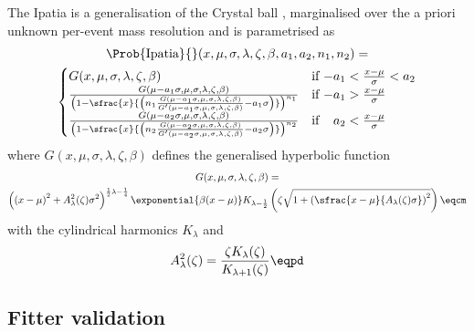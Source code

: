 The Ipatia \PDF \cite{Santos:2013gra} is a generalisation of the Crystal ball
\PDF \cite{Oreglia:1980cs,Gaiser:1982yw,Skwarnicki:1986xj}, marginalised over
the a priori unknown per-event mass resolution and is parametrised as
%
\begin{multline}\label{eq:measurement_of_sin2beta:likelihood_fit:pdfs:ipatia}
  \Prob{\text{Ipatia}}{}(x, \mu, \sigma, \lambda, \zeta, \beta, a_1, a_2, n_1, n_2) = \\
    \begin{cases}
      G(x, \mu, \sigma, \lambda, \zeta, \beta)    & \text{if $-a_1 < \frac{x-\mu}{\sigma} < a_2$} \\
      \frac{G(\mu - a_1 \sigma, \mu, \sigma, \lambda, \zeta, \beta)}{
        \left( 1 - \sfrac{x}{\left( n_1 \frac{G(\mu - a_1 \sigma, \mu, \sigma, \lambda, \zeta, \beta)}{G^\prime(\mu - a_1 \sigma, \mu, \sigma, \lambda, \zeta, \beta)} - a_1 \sigma \right)} \right)^{n_1}
      }     & \text{if $-a_1 > \frac{x-\mu}{\sigma}$} \\
      \frac{G(\mu - a_2 \sigma, \mu, \sigma, \lambda, \zeta, \beta)}{
        \left( 1 - \sfrac{x}{\left( n_2 \frac{G(\mu - a_2 \sigma, \mu, \sigma, \lambda, \zeta, \beta)}{G^\prime(\mu - a_2 \sigma, \mu, \sigma, \lambda, \zeta, \beta)} - a_2 \sigma \right)} \right)^{n_2}
      }     & \text{if $\phantom{-}a_2 < \frac{x-\mu}{\sigma}$} \\
  \end{cases}
\end{multline}
%
where $G(x, \mu, \sigma, \lambda, \zeta, \beta)$ defines the generalised hyperbolic function
\begin{multline}\label{eq:measurement_of_sin2beta:likelihood_fit:pdfs:generalised_hyperbolic}
  G(x, \mu, \sigma, \lambda, \zeta, \beta) = \\
  \left(\left(x - \mu\right)^2 + A_\lambda^2(\zeta) \sigma^2 \right)^{\frac{1}{2} \lambda - \frac{1}{4}}
  \exponential{\beta (x - \mu)} K_{\lambda-\frac{1}{2}}
  \left(\zeta \sqrt{1 + \left(\sfrac{x - \mu}{A_\lambda(\zeta) \sigma}\right)^2} \right)\eqcm
\end{multline}
%
with the cylindrical harmonics $K_\lambda$ and
%
\begin{equation}
  A_\lambda^2(\zeta) = \frac{\zeta K_\lambda(\zeta)}{K_{\lambda+1}(\zeta)}\eqpd
\end{equation}


\newpage




\subsection{Fitter validation}
\label{sec:measurement_of_sin2beta:likelihood_fit:validation}
